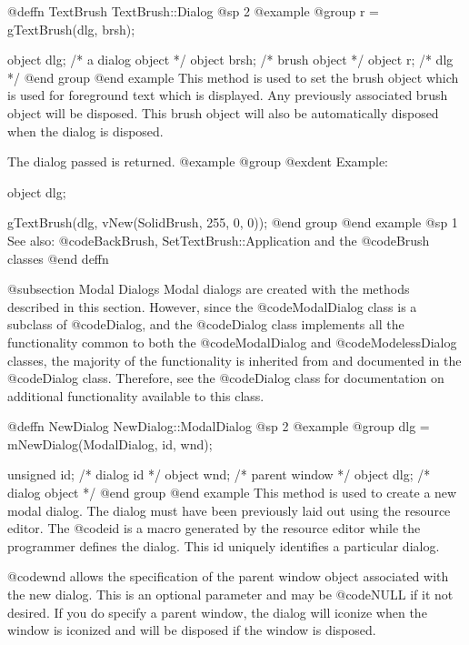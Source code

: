 @deffn {TextBrush} TextBrush::Dialog
@sp 2
@example
@group
r = gTextBrush(dlg, brsh);

object  dlg;    /*  a dialog object   */
object  brsh;   /*  brush object      */
object  r;      /*  dlg               */
@end group
@end example
This method is used to set the brush object which is used for foreground
text which is displayed.  Any previously associated brush object will
be disposed.  This brush object will also be automatically disposed when the
dialog is disposed.

The dialog passed is returned.
@example
@group
@exdent Example:

object  dlg;

gTextBrush(dlg, vNew(SolidBrush, 255, 0, 0));
@end group
@end example
@sp 1
See also:  @code{BackBrush, SetTextBrush::Application}
        and the @code{Brush} classes
@end deffn



















@subsection Modal Dialogs
Modal dialogs are created with the methods described in this section.
However, since the @code{ModalDialog} class is a subclass of @code{Dialog},
and the @code{Dialog} class implements all the functionality common to
both the @code{ModalDialog} and @code{ModelessDialog} classes, the
majority of the functionality is inherited from and documented in
the @code{Dialog} class.  Therefore, see the @code{Dialog} class
for documentation on additional functionality available to this class.



@deffn {NewDialog} NewDialog::ModalDialog
@sp 2
@example
@group
dlg = mNewDialog(ModalDialog, id, wnd);

unsigned  id;   /*  dialog id      */
object    wnd;  /*  parent window  */
object    dlg;  /*  dialog object  */
@end group
@end example
This method is used to create a new modal dialog.  The dialog must have
been previously laid out using the resource editor.  The @code{id}
is a macro generated by the resource editor while the programmer defines
the dialog.  This id uniquely identifies a particular dialog.

@code{wnd} allows the specification of the parent window object associated
with the new dialog.  This is an optional parameter and may be @code{NULL}
if it not desired.  If you do specify a parent window, the dialog will
iconize when the window is iconized and will be disposed if the window
is disposed.

